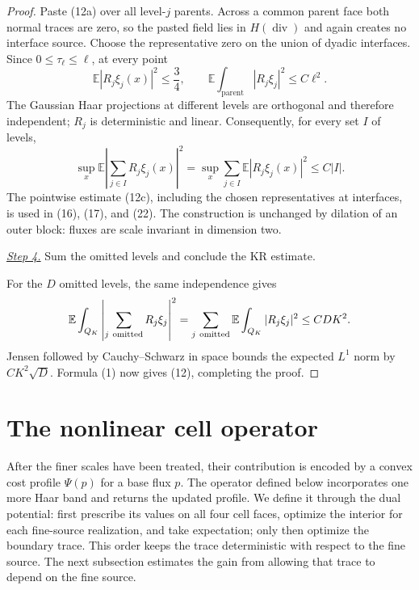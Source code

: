 \documentclass{aomart}
\theoremstyle{definition}
\newcommand{\1}{\mathbf 1}
\begin{document}
\begin{proof}
Paste (12a) over all level-$j$ parents.  Across a common parent face both
normal traces are zero, so the pasted field lies in
$H(\operatorname {div})$ and again creates no interface source.  Choose
the representative zero on the union of dyadic interfaces.  Since
$0\leq\tau_ \ell\leq\ell$, at every point
\begin{equation}
\mathbb E|R_ j\xi_ j(x)|^2\leq \frac34,\qquad
\mathbb E\int_ {\text{parent}}|R_ j\xi_ j|^2\leq C\ell^2.
\tag{12b}
\end{equation}
The Gaussian Haar projections at different levels are orthogonal and
therefore independent; $R_ j$ is deterministic and linear.  Consequently,
for every set $I$ of levels,
\begin{equation}
\sup_ x\mathbb E\left|\sum_ {j\in I}R_ j\xi_ j(x)\right|^2
=\sup_ x\sum_ {j\in I}\mathbb E|R_ j\xi_ j(x)|^2
\leq C|I|.
\tag{12c}
\end{equation}
The pointwise estimate (12c), including the chosen representatives at
interfaces, is used in (16), (17), and (22).  The construction is unchanged
by dilation of an outer block: fluxes are scale invariant in dimension two.

\smallskip\noindent
\underline{\textit{Step 4.}} Sum the omitted levels and conclude the KR estimate.

For the $D$ omitted levels, the same independence gives
\begin{equation*}
\mathbb E\int_ {Q_ K}\left|\sum_ {j\ {\rm omitted}}R_ j\xi_ j\right|^2
=\sum_ {j\ {\rm omitted}}\mathbb E\int_ {Q_ K}|R_ j\xi_ j|^2
\leq CDK^2.
\end{equation*}
Jensen followed by Cauchy--Schwarz in space bounds the expected
$L^1$ norm by $CK^2\sqrt D$.  Formula (1) now gives (12), completing
the proof.

\end{proof}

\section{The nonlinear cell operator}\label{sec:cell-operator}

After the finer scales have been treated, their contribution is encoded
by a convex cost profile $\Psi(p)$ for a base flux $p$.  The operator
defined below incorporates one more Haar band and returns the updated
profile.  We define it through the dual potential: first prescribe its
values on all four cell faces, optimize the interior for each fine-source
realization, and take expectation; only then optimize the boundary trace.
This order keeps the trace deterministic with respect to the fine source.
The next subsection estimates the gain from allowing that trace to depend
on the fine source.
\end{document}
